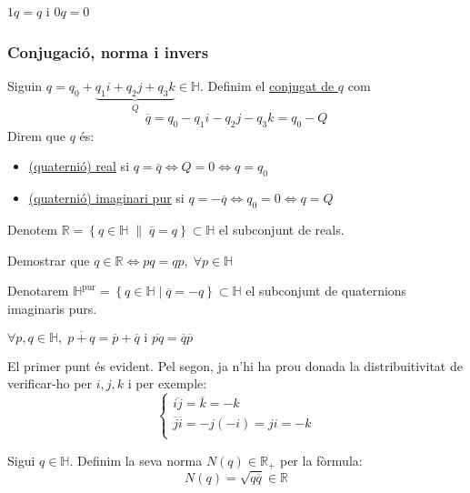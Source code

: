 \documentclass[../main.tex]{subfiles}
\begin{document}
	\begin{obs}
		$1q = q$ i $0q = 0$
	\end{obs}
	\subsubsection{Conjugació, norma i invers}
	\begin{definicio}
		Siguin $q = q_0 + \underbrace{q_1i + q_2j + q_3k}_{Q} \in \mathbb{H}$. Definim el \underline{conjugat de $q$} com
		\begin{displaymath}
			\overline{q} = q_0 - q_1i - q_2j - q_3k = q_0 - Q
		\end{displaymath}
		Direm que $q$ és:
		\begin{itemize}
			\item \underline{(quaternió) real} si $q = \overline{q} \iff Q=0 \iff q = q_0$
			\item \underline{(quaternió) imaginari pur} si $q = -\overline{q} \iff q_0 = 0 \iff q = Q$
		\end{itemize}
	\end{definicio}
	Denotem $\mathbb{R} = \left\{q \in \mathbb{H}\;\|\; \overline{q} = q \right\} \subset \mathbb{H}$ el subconjunt de reals.
	\begin{exercici}
		Demostrar que $q \in \mathbb{R} \iff pq = qp,\;\forall p \in \mathbb{H}$
	\end{exercici}
	Denotarem $\mathbb{H}^\text{pur} = \left\{q \in \mathbb{H}\;|\;\overline{q} = -q \right\} \subset \mathbb{H}$ el subconjunt de quaternions imaginaris purs.
	\begin{proposicio}
		$\forall p,q \in \mathbb{H},\; \overline{p+q} = \overline{p} + \overline{q}\text{ i }\overline{pq} = \overline{q}\overline{p}$
	\end{proposicio}
	\begin{demostracio}
        El primer punt és evident. Pel segon, ja n'hi ha prou donada la distribuitivitat de verificar-ho per $i, j, k$ i per exemple:
        \begin{displaymath}
        	\begin{cases}
	       		\overline{ij} = \overline{k} = -k\\
	         	\overline{j}\overline{i} = -j(-i) = ji = -k\\
			\end{cases}
		\end{displaymath}
	\end{demostracio}
	\begin{definicio}
		Sigui $q \in \mathbb{H}$. Definim la seva norma $N(q) \in \mathbb{R}_+$ per la fòrmula:
		\begin{displaymath}
			N(q) = \sqrt{q\overline{q}} \in \mathbb{R}
		\end{displaymath}
	\end{definicio}
\end{document}
